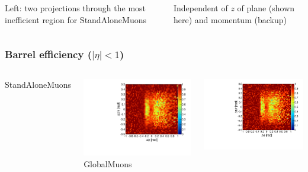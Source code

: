 \documentclass[compress]{beamer}
\begin{document}
\begin{frame}
\begin{columns}
Left: two projections through the most inefficient region for StandAloneMuons

\vspace{0.2 cm}
Independent of $z$ of plane (shown here) and momentum (backup)
\end{columns}
\end{frame}

\begin{frame}
\frametitle{Barrel efficiency ($|\eta| < 1$)}
\begin{columns}
\centering StandAloneMuons

\includegraphics[width=\linewidth]{barrel_dphidr_StandAloneMuon.pdf}
\centering GlobalMuons

\includegraphics[width=\linewidth]{barrel_dphidr_GlobalMuon.pdf}


\end{columns}
\end{frame}
\end{document}
